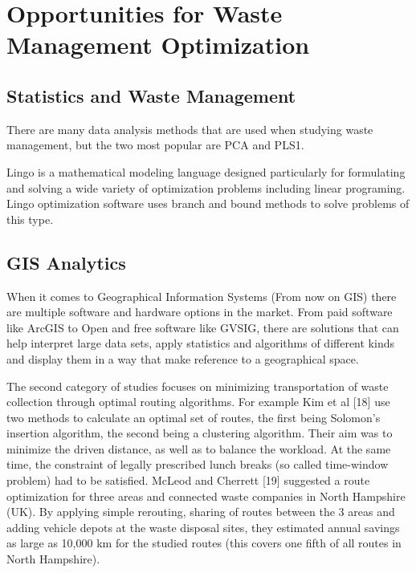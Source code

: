 \documentclass[sigconf]{acmart}
\begin{document}
\section{Opportunities for Waste Management Optimization}





\subsection{Statistics and Waste Management}

There are many data analysis methods that are used when studying waste management, but the two most popular are PCA and PLS1. 
~\cite{bohm2013}

Lingo is a mathematical modeling language designed particularly for formulating and solving a wide variety of optimization problems including linear programing. Lingo optimization software uses branch and bound methods to solve problems of this type. ~\cite{akbarpour2016}

\subsection{GIS Analytics}

When it comes to Geographical Information Systems (From now on GIS) there are multiple software and hardware options in the market. From paid software like ArcGIS to Open and free software like GVSIG, there are solutions that can help interpret large data sets, apply statistics and algorithms of different kinds and display them in a way that make reference to a geographical space. %



The second category of studies focuses on minimizing transportation of waste collection through optimal routing algorithms. For example Kim et al [18] use two methods to calculate an optimal set of routes, the first being Solomon's insertion algorithm, the second being a clustering algorithm. Their aim was to minimize the driven distance, as well as to balance the workload. At the same time, the constraint of legally prescribed lunch breaks (so called time-window problem) had to be satisfied. McLeod and Cherrett [19] suggested a route optimization for three areas and connected waste companies in North Hampshire (UK). By applying simple rerouting, sharing of routes between the 3 areas and adding vehicle depots at the waste disposal sites, they estimated annual savings as large as 10,000 km for the studied routes (this covers one fifth of all routes in North Hampshire). 
\end{document}
